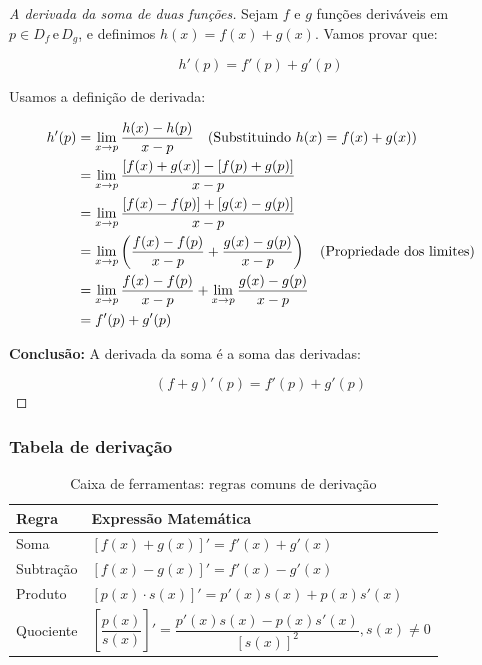 \documentclass[12pt,openright,twoside,a4paper]{article}
\theoremstyle{definition}
\begin{document}
	\begin{proof}[A derivada da soma de duas funções]
		
		Sejam \( f \) e \( g \) funções deriváveis em \( p \in D_f\, \text{e}\, D_g \), e definimos \( h(x) = f(x) + g(x) \). Vamos provar que:
		
		
		
		\[
		h'(p) = f'(p) + g'(p)
		\]
		
		
		
		Usamos a definição de derivada:
		
		\begin{align*}
			h'(p) &= \lim_{x \to p} \dfrac{h(x) - h(p)}{x - p} \quad \text{(Substituindo $h(x) = f(x) + g(x)$)}\\
			&= \lim_{x \to p} \dfrac{[f(x) + g(x)] - [f(p) + g(p)]}{x - p} \\
			&= \lim_{x \to p} \dfrac{[f(x) - f(p)] + [g(x) - g(p)]}{x - p} \\
			&= \lim_{x \to p} \left( \dfrac{f(x) - f(p)}{x - p} + \dfrac{g(x) - g(p)}{x - p} \right) \quad \text{(Propriedade dos limites)}\\
			&= \lim_{x \to p} \dfrac{f(x) - f(p)}{x - p} + \lim_{x \to p} \dfrac{g(x) - g(p)}{x - p} \\
			&= f'(p) + g'(p) \qedhere
		\end{align*}
		
		\textbf{Conclusão:} A derivada da soma é a soma das derivadas:
		
		\[
		\boxed{(f + g)'(p) = f'(p) + g'(p)}
		\]
	\end{proof}
	
	\subsubsection{Tabela de derivação}
	
	\renewcommand{\arraystretch}{2.5}
	\begin{table}[h]
		\centering
		\caption{Caixa de ferramentas: regras comuns de derivação}
		\begin{tabular}{|>{\centering\arraybackslash}m{3cm}|>{\centering\arraybackslash}m{10cm}|}
			\hline
			\textbf{Regra} & \textbf{Expressão Matemática} \\
			\hline
			Soma & $\displaystyle[f(x) + g(x)]' = f'(x) + g'(x)$ \\
			\hline
			Subtração & $\displaystyle [f(x) - g(x)]' = f'(x) - g'(x)$ \\
			\hline
			Produto & $\displaystyle [p(x) \cdot s(x)]' = p'(x)s(x) + p(x)s'(x)$ \\
			\hline
			Quociente & $\displaystyle \left[\dfrac{p(x)}{s(x)}\right]' = \dfrac{p'(x)s(x) - p(x)s'(x)}{[s(x)]^2}, s(x) \neq 0$ \\
			\hline
		\end{tabular}
	\end{table}
	\renewcommand{\arraystretch}{1.0}
	
\end{document}

